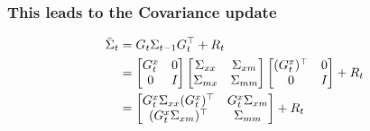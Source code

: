 \begin{frame}
    \frametitle{This leads to the Covariance update}

    \begin{align*}
        \bar{\Sigma}_t &= G_t \Sigma_{t-1} G_t^{\top} + R_t \\
        &= 
        \begin{bmatrix}
        G_{t}^{x} & 0 \\
        0 & I
        \end{bmatrix}
        \begin{bmatrix}
        \Sigma_{xx} & \Sigma_{xm} \\
        \Sigma_{mx} & \Sigma_{mm}
        \end{bmatrix}
        \begin{bmatrix}
        (G_{t}^{x})^{\top} & 0 \\
        0 & I
        \end{bmatrix}
        + R_t \\
        &=
        \begin{bmatrix}
        G_{t}^{x} \Sigma_{xx} (G_{t}^{x})^{\top} & G_{t}^{x} \Sigma_{xm} \\
        (G_{t}^{x} \Sigma_{xm})^{\top} & \Sigma_{mm}
        \end{bmatrix}
        + R_t
    \end{align*}

\end{frame}


